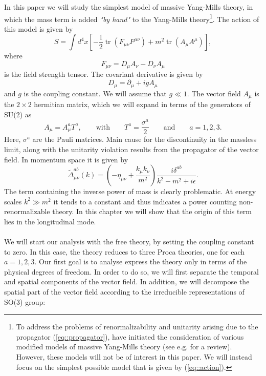 \documentclass{article}
\DeclareMathOperator{\tr}{tr}
\begin{document}
In this paper we will study the simplest model of massive Yang-Mills theory, in which the mass term is added \textit{"by hand"} to the Yang-Mills theory\footnote{To address the problems of renormalizability and unitarity arising due to the propagator (\ref{eq::propagator}), \cite{FradkinTy} have initiated the consideration of various modified models of massive Yang-Mills theory (see e.g. \cite{Delburgo, Ruegg} for a review). However, these models will not be of interest in this paper. We will instead focus on the simplest possible model that is given by (\ref{eq::action}). }. The action of this model is given by 
\begin{equation}\label{eq::action}
    S=\int d^4x \left[-\frac{1}{2}\tr(F_{\mu\nu}F^{\mu\nu})+m^2\tr(A_{\mu}A^{\mu})\right],
\end{equation}
where 
\begin{equation}
      F_{\mu\nu}=D_{\mu}A_{\nu}-D_{\nu}A_{\mu}
\end{equation}
is the field strength tensor. The covariant derivative is given by  
\begin{equation}
    D_{\mu}=\partial_{\mu}+igA_{\mu}
\end{equation}
 and $g$ is the coupling constant. We will assume that $g\ll 1$. The vector field $A_{\mu}$ is the $2\times2$ hermitian matrix, which we will expand in terms of the generators of SU(2) as 
\begin{equation}
    A_{\mu}=A_{\mu}^aT^a,    \qquad \text{with}\qquad T^a=\frac{\sigma^a}{2} \qquad\text{and}\qquad a=1,2,3.
\end{equation}
Here, $\sigma^a$ are the Pauli matrices. Main cause for the discontinuity in the massless limit, along with the unitarity violation results from the propagator of the vector field. In momentum space it is given by 
\begin{equation}\label{eq::propagator}
    \tilde{\Delta}_{\mu\nu}^{ab}(k)=\left(-\eta_{\mu\nu}+\frac{k_{\mu}k_{\nu}}{m^2}\right)\frac{i\delta^{ab}}{k^2-m^2+i\epsilon}.
\end{equation}
The term containing the inverse power of mass is clearly problematic. At energy scales $k^2\gg m^2$ it tends to a constant and thus indicates a power counting non-renormalizable theory. In this chapter we will show that the origin of this term lies in the longitudinal mode. 
\\\\
We will start our analysis with the free theory, by setting the coupling constant to zero. In this case, the theory reduces to three Proca theories, one for each $a=1,2,3$. Our first goal is to analyse express the theory only in terms of the physical degrees of freedom. In order to do so, we will first separate the temporal and spatial components of the vector field. In addition, we will decompose the spatial part of the vector field according to the irreducible representations of SO(3) group:
\end{document}
